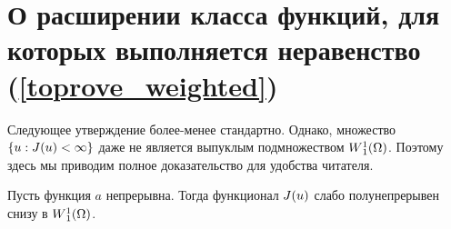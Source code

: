 \section{О расширении класса функций, для которых выполняется неравенство (\ref{toprove_weighted})}



Следующее утверждение более-менее стандартно.
Однако, множество $\{u: J(u) < \infty\}$ даже не является выпуклым подмножеством $W{}_1^1(\Omega)$.
Поэтому здесь мы приводим полное доказательство для удобства читателя.

\begin{lm}
Пусть функция $a$ непрерывна.
Тогда функционал $J(u)$ слабо полунепрерывен снизу в $W{}_1^1(\Omega)$.
\label{lowersemi}
\end{lm}


